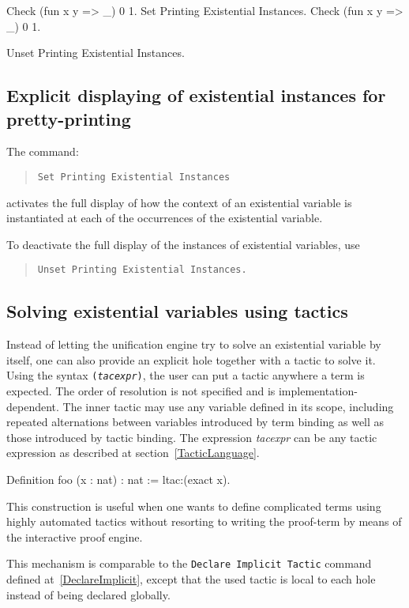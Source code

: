 \begin{coq_example}
Check (fun x y => _) 0 1.
Set Printing Existential Instances.
Check (fun x y => _) 0 1.
\end{coq_example}

\begin{coq_eval}
Unset Printing Existential Instances.
\end{coq_eval}

\subsection{Explicit displaying of existential instances for pretty-printing
\label{SetPrintingExistentialInstances}
}

The command:
\begin{quote}
{\tt Set Printing Existential Instances}
\end{quote}
activates the full display of how the context of an existential variable is
instantiated at each of the occurrences of the existential variable.

To deactivate the full display of the instances of existential
variables, use
\begin{quote}
{\tt Unset Printing Existential Instances.}
\end{quote}

\subsection{Solving existential variables using tactics}

\def\expr{\textrm{\textsl{tacexpr}}}

Instead of letting the unification engine try to solve an existential variable
by itself, one can also provide an explicit hole together with a tactic to solve
it. Using the syntax {\tt \textdollar(\expr)\textdollar}, the user can put a
tactic anywhere a term is expected. The order of resolution is not specified and
is implementation-dependent. The inner tactic may use any variable defined in
its scope, including repeated alternations between variables introduced by term
binding as well as those introduced by tactic binding. The expression {\expr}
can be any tactic expression as described at section~\ref{TacticLanguage}.

\begin{coq_example*}
Definition foo (x : nat) : nat := ltac:(exact x).
\end{coq_example*}

This construction is useful when one wants to define complicated terms using
highly automated tactics without resorting to writing the proof-term by means of
the interactive proof engine.

This mechanism is comparable to the {\tt Declare Implicit Tactic} command
defined at~\ref{DeclareImplicit}, except that the used tactic is local to each
hole instead of being declared globally.

